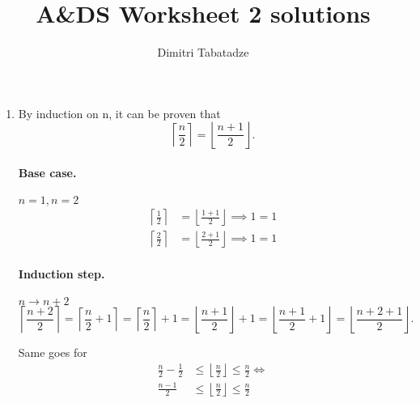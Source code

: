 \documentclass{article}
\title{A\&DS Worksheet 2 solutions}
\author{Dimitri Tabatadze}
\begin{document}
    \maketitle

    \begin{enumerate}
        \item {
            By induction on n, it can be proven that
            \begin{displaymath}
                \left\lceil\frac{n}{2}\right\rceil = \left\lfloor\frac{n+1}{2}\right\rfloor.
            \end{displaymath}

            \paragraph{Base case.} \(n=1, n=2\)
            \begin{displaymath}
                \begin{aligned}
                    \left\lceil\frac{1}{2}\right\rceil &= \left\lfloor\frac{1+1}{2}\right\rfloor \implies 1 = 1\\
                    \left\lceil\frac{2}{2}\right\rceil &= \left\lfloor\frac{2+1}{2}\right\rfloor \implies 1 = 1
                \end{aligned}
            \end{displaymath}

            \paragraph{Induction step.} \(n\to n+2\)
            \begin{displaymath}
                \left\lceil\frac{n+2}{2}\right\rceil 
                = \left\lceil\frac{n}{2} + 1\right\rceil 
                = \left\lceil\frac{n}{2}\right\rceil + 1 
                = \left\lfloor\frac{n+1}{2}\right\rfloor + 1 
                = \left\lfloor\frac{n+1}{2} + 1\right\rfloor
                = \left\lfloor\frac{n+2+1}{2}\right\rfloor.
            \end{displaymath}

            Same goes for
            \begin{align*}
                \frac{n}{2} - \frac{1}{2} &\leq \left\lfloor\frac{n}{2}\right\rfloor \leq \frac{n}{2} \Longleftrightarrow \\
                \frac{n - 1}{2} &\leq \left\lfloor\frac{n}{2}\right\rfloor \leq \frac{n}{2} \\
            \end{align*}

}
\end{enumerate}
\end{document}
